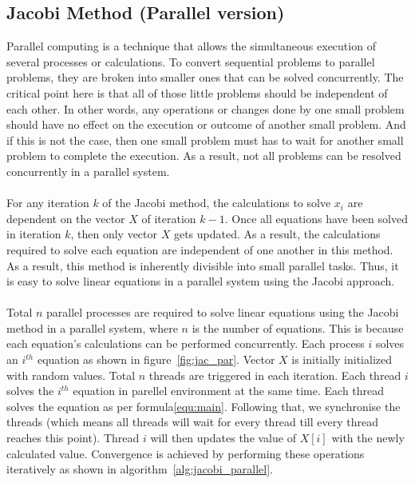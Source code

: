 \documentclass[11pt]{article}       %
\begin{document}
\subsection{Jacobi Method (Parallel version)}

Parallel computing is a technique that allows the simultaneous execution of several processes or calculations. To convert sequential problems to parallel problems, they are broken into smaller ones that can be solved concurrently. The critical point here is that all of those little problems should be independent of each other. In other words, any operations or changes done by one small problem should have no effect on the execution or outcome of another small problem. And if this is not the case, then one small problem must has to wait for another small problem to complete the execution. As a result, not all problems can be resolved concurrently in a parallel system.
\\
\\
For any iteration $k$ of the Jacobi method, the calculations to solve $x_i$ are dependent on the vector $X$ of iteration $k-1$. Once all equations have been solved in iteration $k$, then only vector $X$ gets updated. As a result, the calculations required to solve each equation are independent of one another in this method. As a result, this method is inherently divisible into small parallel tasks. Thus, it is easy to solve linear equations in a parallel system using the Jacobi approach.
\\
\\
Total $n$ parallel processes are required to solve linear equations using the Jacobi method in a parallel system, where $n$ is the number of equations. This is because each equation's calculations can be performed concurrently. Each process $i$ solves an $i^{th}$ equation as shown in figure~\ref{fig:jac_par}. Vector $X$ is initially initialized with random values. Total $n$ threads are triggered in each iteration. Each thread $i$ solves the $i^{th}$ equation in parellel environment at the same time. Each thread solves the equation as per formula\eqref{equ:main}. Following that, we synchronise the threads (which means all threads will wait for every thread till every thread reaches this point). Thread $i$ will then updates the value of $X[i]$ with the newly calculated value. Convergence is achieved by performing these operations iteratively as shown in algorithm~\ref{alg:jacobi_parallel}.
\end{document}
